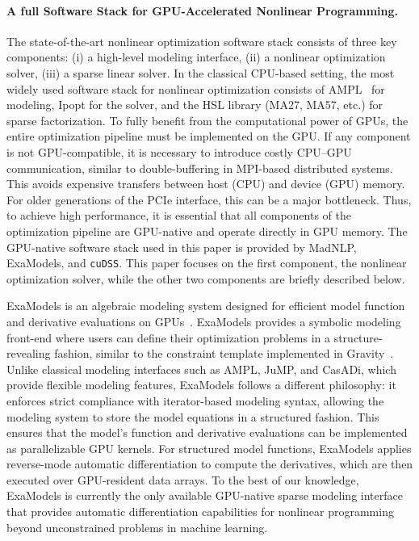 \paragraph{A full Software Stack for GPU-Accelerated Nonlinear Programming.}
The state-of-the-art nonlinear optimization software stack consists of three key components:
(i) a high-level modeling interface,
(ii) a nonlinear optimization solver,
(iii) a sparse linear solver.
In the classical CPU-based setting, the most widely used software stack for nonlinear optimization consists of AMPL~\cite{fourer1990ampl} for modeling, Ipopt for the solver, and the HSL library (MA27, MA57, etc.) for sparse factorization.
To fully benefit from the computational power of GPUs, the entire optimization pipeline must be implemented on the GPU.
If any component is not GPU-compatible, it is necessary to introduce costly CPU–GPU communication, similar to double-buffering in MPI-based distributed systems.
This avoids expensive transfers between host (CPU) and device (GPU) memory.
For older generations of the PCIe interface, this can be a major bottleneck.
Thus, to achieve high performance, it is essential that all components of the optimization pipeline are GPU-native and operate directly in GPU memory.
The GPU-native software stack used in this paper is provided by MadNLP, ExaModels, and {\tt cuDSS}.
This paper focuses on the first component, the nonlinear optimization solver, while the other two components are briefly described below.

ExaModels is an algebraic modeling system designed for efficient model function and derivative evaluations on GPUs~\cite{shin2023accelerating}.
ExaModels provides a symbolic modeling front-end where users can define their optimization problems in a structure-revealing fashion, similar to the constraint template implemented in Gravity~\cite{hijazi2018gravity}.
Unlike classical modeling interfaces such as AMPL, JuMP, and CasADi, which provide flexible modeling features, ExaModels follows a different philosophy: it enforces strict compliance with iterator-based modeling syntax, allowing the modeling system to store the model equations in a structured fashion.
This ensures that the model's function and derivative evaluations can be implemented as parallelizable GPU kernels.
For structured model functions, ExaModels applies reverse-mode automatic differentiation to compute the derivatives, which are then executed over GPU-resident data arrays.
To the best of our knowledge, ExaModels is currently the only available GPU-native sparse modeling interface that provides automatic differentiation capabilities for nonlinear programming beyond unconstrained problems in machine learning.

